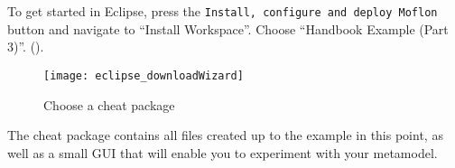 \begin{stepbystep}

\item To get started in Eclipse, press the \texttt{Install, configure and deploy Moflon} button and navigate to ``Install Workspace''. Choose ``Handbook Example (Part 3)''.
().

\begin{figure}[htbp]
	\centering
  \texttt{[image: eclipse\_downloadWizard]}
	\caption{Choose a cheat package}
	\label{eclipse:downloadWizard}
\end{figure}

\item The cheat package contains all files created up to the example in this point, as well as a small GUI that will enable
you to experiment with your metamodel.

\newpage

\vspace*{0.5cm}
%
%
%
\end{stepbystep}
%
%
%

